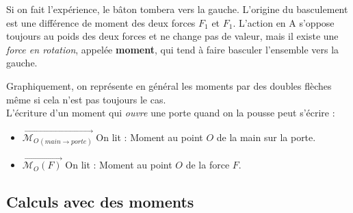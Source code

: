 \documentclass[
	11pt, %
	fleqn, %
	a4paper, %
]{LegrandOrangeBook}
\begin{document}
Si on fait l'expérience, le bâton tombera vers la gauche. L’origine du basculement est une différence de moment des deux forces $F_1$ et $F_1$. L’action en A s’oppose toujours au poids des deux forces et ne change pas de valeur, mais il existe une \textit{force en rotation}, appelée \textbf{moment}, qui tend à faire basculer l’ensemble vers la gauche.

Graphiquement, on représente en général les moments par des doubles flèches même si cela n'est pas toujours le cas.\\

\noindent L'écriture d'un moment qui \textit{ouvre} une porte quand on la pousse peut s'écrire :\\
\begin{itemize}

\item $\overrightarrow{\mathcal{M}_{O}{}_{\left( main\rightarrow porte\right)}}$ 
\noindent On lit : Moment au point $O$ de la main sur la porte.

\item $\overrightarrow{\mathcal{M}_{O}{(F)}}$
\noindent On lit : Moment au point $O$ de la force $F$.

\end{itemize}
\subsection{Calculs avec des moments}
\end{document}
